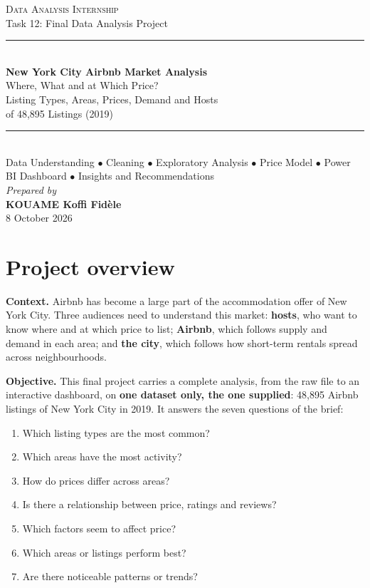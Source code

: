 \documentclass[12pt,a4paper]{article}
\begin{document}
\begin{titlepage}\centering
\singlespacing
\vspace*{3cm}
{\large\scshape Data Analysis Internship}\\[0.4cm]
{\normalsize Task 12: Final Data Analysis Project}\\[2.0cm]
\rule{\linewidth}{0.5pt}\\[0.8cm]
{\LARGE\bfseries New York City Airbnb Market Analysis}\\[0.6cm]
{\large Where, What and at Which Price?\\ Listing Types, Areas, Prices, Demand and Hosts\\ of 48{,}895 Listings (2019)}\\[0.8cm]
\rule{\linewidth}{0.5pt}\\[1.2cm]
{\normalsize Data Understanding $\bullet$ Cleaning $\bullet$ Exploratory Analysis $\bullet$ Price Model
$\bullet$ Power BI Dashboard $\bullet$ Insights and Recommendations}\\[3.0cm]
{\large\itshape Prepared by}\\[0.5cm]
{\Large\bfseries KOUAME Koffi Fid\`ele}\\[0.6cm]
{\large 8 October 2026}
\vfill\end{titlepage}

\singlespacing
\tableofcontents\newpage
\onehalfspacing

\section{Project overview}

\textbf{Context.} Airbnb has become a large part of the accommodation offer of New York City.
Three audiences need to understand this market: \textbf{hosts}, who want to know where and at
which price to list; \textbf{Airbnb}, which follows supply and demand in each area; and
\textbf{the city}, which follows how short-term rentals spread across neighbourhoods.

\textbf{Objective.} This final project carries a complete analysis, from the raw file to an
interactive dashboard, on \textbf{one dataset only, the one supplied}: 48{,}895 Airbnb listings
of New York City in 2019. It answers the seven questions of the brief:
\begin{enumerate}[label=Q\arabic*.]
\item Which listing types are the most common?
\item Which areas have the most activity?
\item How do prices differ across areas?
\item Is there a relationship between price, ratings and reviews?
\item Which factors seem to affect price?
\item Which areas or listings perform best?
\item Are there noticeable patterns or trends?
\end{enumerate}
\end{document}
